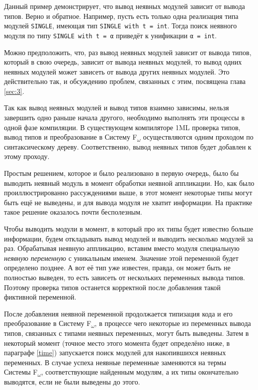 \documentclass[../diploma.tex]{subfiles}
\begin{document}
Данный пример демонстрирует, что вывод неявных модулей зависит от вывода типов. Верно и обратное. Например, пусть есть только одна реализация типа модулей \texttt{SINGLE}, имеющая тип \texttt{SINGLE with t = int}. Тогда поиск неявного модуля по типу \texttt{SINGLE with t = α} приведёт к унификации \texttt{α = int}.

Можно предположить, что, раз вывод неявных модулей зависит от вывода типов, который в свою очередь, зависит от вывода неявных модулей, то вывод одних неявных модулей может зависеть от вывода других неявных модулей. Это действительно так, и обсуждению проблем, связанных с этим, посвящена глава \ref{sec:3}.

Так как вывод неявных модулей и вывод типов взаимно зависимы, нельзя завершить одно раньше начала другого, необходимо выполнять эти процессы в одной фазе компиляции. В существующем компиляторе 1ML проверка типов, вывод типов и преобразование в Систему F\textsubscript{$\omega$} осуществляются одним проходом по синтаксическому дереву. Соответственно, вывод неявных типов будет добавлен к этому проходу.

Простым решением, которое и было реализовано в первую очередь, было бы выводить неявный модуль в момент обработки неявной аппликации. Но, как было проиллюстрированно рассуждениями выше, в этот момент некоторые типы могут быть ещё не выведены, и для вывода модуля не хватит информации. На практике такое решение оказалось почти бесполезным.

Чтобы выводить модули в момент, в который про их типы будет известно больше информации, будем откладывать вывод модулей и выводить несколько модулей за раз. Обрабатывая неявную аппликацию, вставим вместо модуля специальную \textit{неявную переменную} с уникальным именем. Значение этой переменной будет определено позднее. А вот её тип уже известен, правда, он может быть не полностью выведен, то есть зависеть от нескольких переменных вывода типов. Поэтому проверка типов останется корректной после добавления такой фиктивной переменной. 

После добавления неявной переменной продолжается типизация кода и его преобразование в Систему F\textsubscript{$\omega$}, в процессе чего некоторые из переменных вывода типов, связанных с типами неявных переменных, могут быть выведены. Затем в некоторый момент (точное место этого момента будет определёно ниже, в параграфе \ref{time}) запускается поиск модулей для накопившихся неявных переменных. В случае успеха неявные переменные заменяются на термы Системы F\textsubscript{$\omega$}, соответствующие найденным модулям, а их типы окончательно выводятся, если не были выведены до этого.
\end{document}
